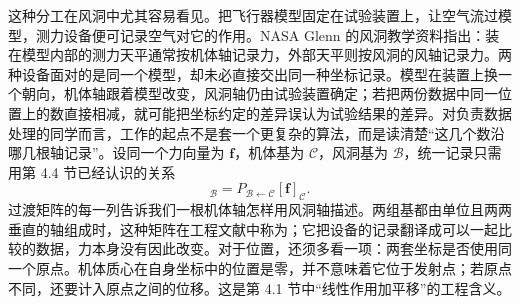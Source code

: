 \documentclass[a4paper,12pt,twoside,openany,fontset=none]{ctexbook}
\numberwithin{equation}{chapter}
\begin{document}
这种分工在风洞中尤其容易看见。把飞行器模型固定在试验装置上，让空气流过模型，测力设备便可记录空气对它的作用。NASA Glenn 的风洞教学资料指出：装在模型内部的测力天平通常按机体轴记录力，外部天平则按风洞的风轴记录力。\cite{nasa-wind-tunnel-axes}两种设备面对的是同一个模型，却未必直接交出同一种坐标记录。模型在装置上换一个朝向，机体轴跟着模型改变，风洞轴仍由试验装置确定；若把两份数据中同一位置上的数直接相减，就可能把坐标约定的差异误认为试验结果的差异。对负责数据处理的同学而言，工作的起点不是套一个更复杂的算法，而是读清楚“这几个数沿哪几根轴记录”。设同一个力向量为 $\boldsymbol f$，机体基为 $\mathcal C$，风洞基为 $\mathcal B$，统一记录只需用第 4.4 节已经认识的关系
\begin{equation}
 [\boldsymbol f]_{\mathcal B}
 =P_{\mathcal B\leftarrow\mathcal C}[\boldsymbol f]_{\mathcal C}.
 \label{eq:four-engineering-vector}
\end{equation}
过渡矩阵的每一列告诉我们一根机体轴怎样用风洞轴描述。两组基都由单位且两两垂直的轴组成时，这种矩阵在工程文献中称为；它把设备的记录翻译成可以一起比较的数据，力本身没有因此改变。对于位置，还须多看一项：两套坐标是否使用同一个原点。机体质心在自身坐标中的位置是零，并不意味着它位于发射点；若原点不同，还要计入原点之间的位移。这是第 4.1 节中“线性作用加平移”的工程含义。
\end{document}
